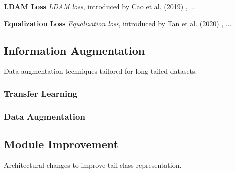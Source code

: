 \myindent \textbf{LDAM Loss} \textit{LDAM loss}, introduced by Cao et al. (2019) \cite{cao2019learningimbalanceddatasetslabeldistributionaware}, ...

\myindent \textbf{Equalization Loss} \textit{Equalization loss}, introduced by Tan et al. (2020) \cite{tan2020equalizationlosslongtailedobject}, ...


\subsection{Information Augmentation}
Data augmentation techniques tailored for long-tailed datasets.

\subsubsection{Transfer Learning}

\subsubsection{Data Augmentation}



\subsection{Module Improvement}
Architectural changes to improve tail-class representation.